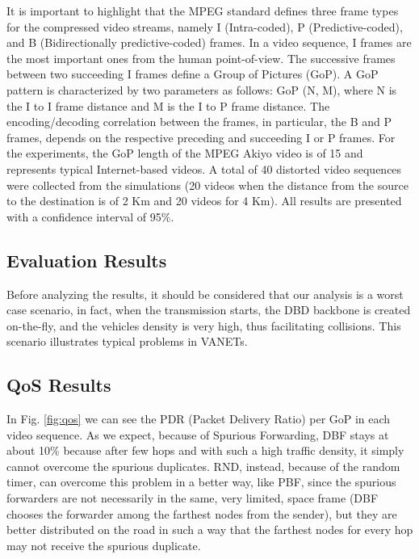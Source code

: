 \documentclass{acm_proc_article-sp}
\begin{document}
It is important to highlight that the MPEG standard defines three frame types for the compressed video streams, namely I (Intra-coded), P (Predictive-coded), and B (Bidirectionally predictive-coded) frames. In a video sequence, I frames are the most important ones from the human point-of-view. The successive frames between two succeeding I frames define a Group of Pictures (GoP). A GoP pattern is characterized by two parameters as follows: GoP (N, M), where N is the I to I frame distance and M is the I to P frame distance. The encoding/decoding correlation between the frames, in particular, the B and P frames, depends on the respective preceding and succeeding I or P frames. For the experiments, the GoP length of the MPEG Akiyo video is of 15 and represents typical Internet-based videos. A total of 40 distorted video sequences were collected from the simulations (20 videos when the distance from the source to the destination is of 2 Km and 20 videos for 4 Km). All results are presented with a confidence interval of 95\%.




\subsection{Evaluation Results}
\label{Evaluation Results}
Before analyzing the results, it should be considered that our analysis is a worst case scenario, in fact, when the transmission starts, the DBD backbone is created on-the-fly, and the vehicles density is very high, thus facilitating collisions. This scenario illustrates typical problems in VANETs.




\subsection{QoS Results}
\label{QoSResults}

In Fig. \ref{fig:qos} we can see the PDR (Packet Delivery Ratio) per GoP in each video sequence. As we expect, because of Spurious Forwarding, DBF stays at about 10\% because after few hops and with such a high traffic density, it simply cannot overcome the spurious duplicates. RND, instead, because of the random timer, can overcome this problem in a better way, like PBF, since the spurious forwarders are not necessarily in the same, very limited, space frame (DBF chooses the forwarder among the farthest nodes from the sender), but they are better distributed on the road in such a way that the farthest nodes for every hop may not receive the spurious duplicate.
\end{document}

